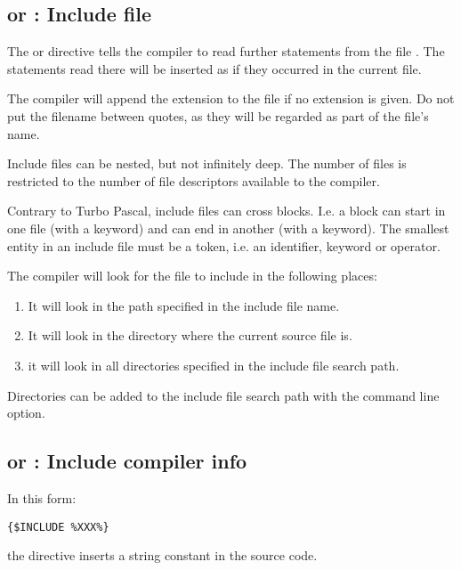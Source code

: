 \subsection{ or  : Include file }

The  or  directive
tells the compiler to read further statements from the file .
The statements read there will be inserted as if they occurred in the
current file.

The compiler will append the  extension to the file if no
extension is given. Do not put the filename between quotes, as
they will be regarded as part of the file's name.

Include files can be nested, but not infinitely deep. The number of files is
restricted to the number of file descriptors available to the \fpc compiler.

Contrary to Turbo Pascal, include files can cross blocks. I.e. 
a block can start in one file (with a  keyword) and can end in another (with
a  keyword). The smallest entity in an include file must be a token,
i.e. an identifier, keyword or operator.

The compiler will look for the file to include in the following places:

\begin{enumerate}
\item It will look in the path specified in the include file name.
\item It will look in the directory where the current source file is.
\item it will look in all directories specified in the include file search
path.
\end{enumerate}
Directories can be added to the include file search path with the 
command line option.

\subsection{ or  : Include compiler info}
In this form:
\begin{verbatim}
{$INCLUDE %XXX%}
\end{verbatim}
the  directive inserts a string constant in the source
code. 

